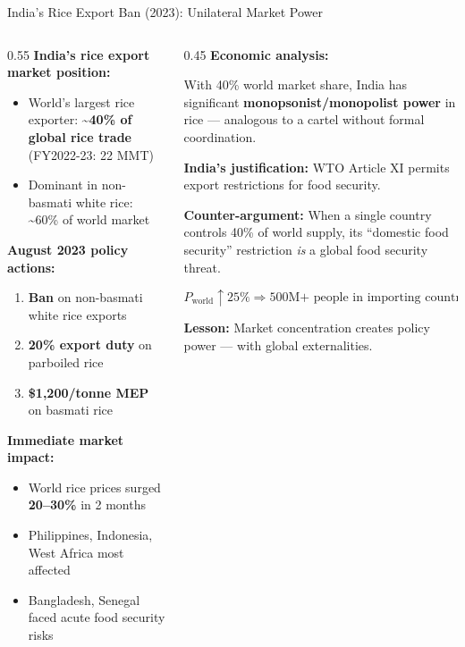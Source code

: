 \documentclass[
  ignorenonframetext,
  aspectratio=169,
]{beamer}
\makeatletter
\providecommand{\tightlist}{%
  \setlength{\itemsep}{0pt}\setlength{\parskip}{0pt}}
\let\quarto@originallabel\label
\DeclareRobustCommand*{\label}[1]{\quarto@originallabel{#1}}
\makeatother
\begin{document}
\begin{frame}{India's Rice Export Ban (2023): Unilateral Market Power}
\label{indias-rice-export-ban-2023-unilateral-market-power}
\begin{columns}[T]
\begin{column}{0.55\linewidth}
\textbf{India's rice export market position:}

\begin{itemize}
\tightlist
\item
  World's largest rice exporter: \textbf{\textasciitilde40\% of global
  rice trade} (FY2022-23: 22 MMT)
\item
  Dominant in non-basmati white rice: \textasciitilde60\% of world
  market
\end{itemize}

\textbf{August 2023 policy actions:}

\begin{enumerate}
\tightlist
\item
  \textbf{Ban} on non-basmati white rice exports
\item
  \textbf{20\% export duty} on parboiled rice
\item
  \textbf{\$1,200/tonne MEP} on basmati rice
\end{enumerate}

\textbf{Immediate market impact:}

\begin{itemize}
\tightlist
\item
  World rice prices surged \textbf{20--30\%} in 2 months
\item
  Philippines, Indonesia, West Africa most affected
\item
  Bangladesh, Senegal faced acute food security risks
\end{itemize}
\end{column}

\begin{column}{0.45\linewidth}
\textbf{Economic analysis:}

With 40\% world market share, India has significant
\textbf{monopsonist/monopolist power} in rice --- analogous to a cartel
without formal coordination.

\textbf{India's justification:} WTO Article XI permits export
restrictions for food security.

\textbf{Counter-argument:} When a single country controls 40\% of world
supply, its ``domestic food security'' restriction \emph{is} a global
food security threat.

\[P_{\text{world}} \uparrow 25\% \Rightarrow \text{500M+ people in importing countries pay more for food}\]

\textbf{Lesson:} Market concentration creates policy power --- with
global externalities.
\end{column}
\end{columns}
\end{frame}
\end{document}
